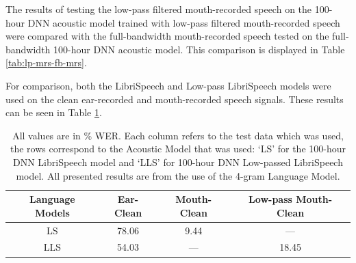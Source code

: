 The results of testing the low-pass filtered mouth-recorded speech on the 100-hour DNN acoustic model trained with low-pass filtered mouth-recorded speech were compared with the full-bandwidth mouth-recorded speech tested on the full-bandwidth 100-hour DNN acoustic model.  This comparison is displayed in Table \ref{tab:lp-mrs-fb-mrs}.



For comparison, both the LibriSpeech and Low-pass LibriSpeech models were used on the clean ear-recorded and mouth-recorded speech signals.  These results can be seen in Table \ref{tab:final-clean-speech}.

\begin{table}[h]
\begin{center}
\begin{tabular}{| c || c | c | c |} \hline
Language Models & Ear-Clean & Mouth-Clean & Low-pass Mouth-Clean \\ \hline\hline
LS & 78.06 & 9.44 & --- \\ \hline
LLS & 54.03 & --- & 18.45 \\ \hline
\end{tabular}
\end{center}
\caption{All values are in \% WER.  Each column refers to the test data which was used, the rows correspond to the Acoustic Model that was used: `LS' for the 100-hour DNN LibriSpeech model and `LLS' for 100-hour DNN Low-passed LibriSpeech model. All presented results are from the use of the 4-gram Language Model.}\label{tab:final-clean-speech}
\end{table}




